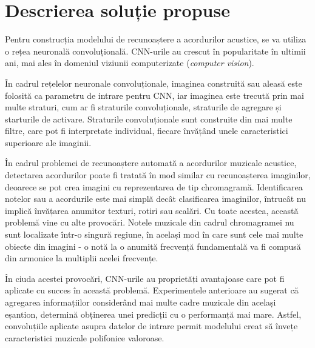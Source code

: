 \documentclass[a4paper,12pt]{report}
\begin{document}
\section{Descrierea soluție propuse}
Pentru construcția modelului de recunoaștere a acordurilor acustice, 
se va utiliza o rețea neuronală convoluțională. 
CNN-urile au crescut în popularitate în ultimii ani, mai ales în domeniul 
viziunii computerizate (\emph{computer vision}). 

În cadrul rețelelor neuronale convoluționale, imaginea construită sau aleasă
este folosită ca parametru de intrare pentru CNN, iar imaginea este trecută prin mai multe straturi, 
cum ar fi straturile convoluționale, straturile de agregare și starturile de activare.
Straturile convoluționale sunt construite din mai multe filtre, care pot fi interpretate individual,
fiecare învățând unele caracteristici superioare ale imaginii. 

În cadrul problemei de recunoaștere automată a acordurilor muzicale acustice,
detectarea acordurilor poate fi tratată în mod similar cu recunoașterea 
imaginilor, deoarece se pot crea imagini cu reprezentarea de tip chromagramă. Identificarea 
notelor sau a acordurile este mai simplă decât clasificarea imaginilor, întrucât nu implică 
învățarea anumitor texturi, rotiri sau scalări. 
Cu toate acestea, această problemă vine cu alte provocări. 
Notele muzicale din cadrul chromagramei nu sunt localizate într-o singură
regiune, în același mod în care sunt cele mai multe obiecte din imagini - o notă 
la o anumită frecvență fundamentală va fi compusă din armonice la multiplii acelei frecvențe.

În ciuda acestei provocări, CNN-urile au proprietăți avantajoase care pot fi aplicate 
cu succes în această problemă. Experimentele anterioare au sugerat că agregarea informațiilor
considerând mai multe cadre muzicale din același eșantion, determină obținerea unei predicții 
cu o performanță mai mare.
Astfel, convoluțiile aplicate asupra datelor de intrare permit modelului creat 
să învețe caracteristici muzicale polifonice valoroase.
\end{document}
